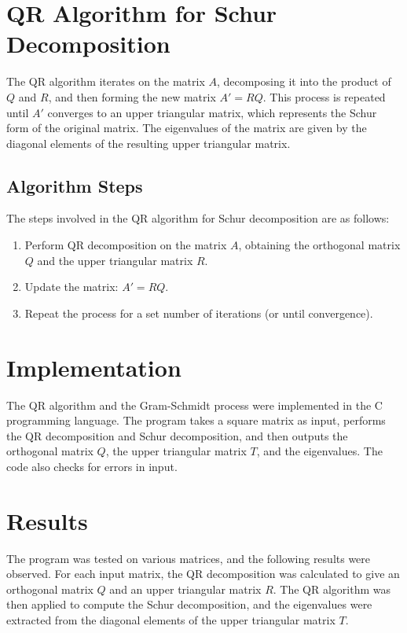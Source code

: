 \documentclass[journal]{IEEEtran}
\begin{document}
\section{QR Algorithm for Schur Decomposition}
The QR algorithm iterates on the matrix \(A\), decomposing it into the product of \(Q\) and \(R\), and then forming the new matrix \(A' = RQ\). This process is repeated until \(A'\) converges to an upper triangular matrix, which represents the Schur form of the original matrix. The eigenvalues of the matrix are given by the diagonal elements of the resulting upper triangular matrix.

\subsection{Algorithm Steps}
The steps involved in the QR algorithm for Schur decomposition are as follows:
\begin{enumerate}
    \item Perform QR decomposition on the matrix \(A\), obtaining the orthogonal matrix \(Q\) and the upper triangular matrix \(R\).
    \item Update the matrix: \( A' = RQ \).
    \item Repeat the process for a set number of iterations (or until convergence).
\end{enumerate}

\section{Implementation}
The QR algorithm and the Gram-Schmidt process were implemented in the C programming language. The program takes a square matrix as input, performs the QR decomposition and Schur decomposition, and then outputs the orthogonal matrix \(Q\), the upper triangular matrix \(T\), and the eigenvalues. The code also checks for errors in input.


\section{Results}
The program was tested on various matrices, and the following results were observed. For each input matrix, the QR decomposition was calculated to give an orthogonal matrix \(Q\) and an upper triangular matrix \(R\). The QR algorithm was then applied to compute the Schur decomposition, and the eigenvalues were extracted from the diagonal elements of the upper triangular matrix \(T\).
\end{document}
